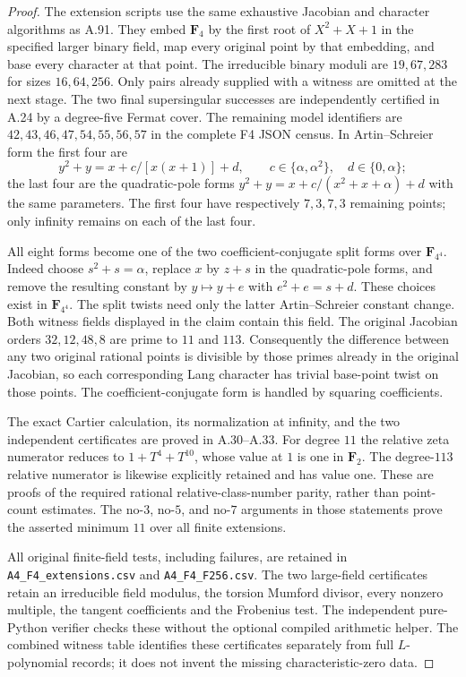 \documentclass[11pt]{article}
\begin{document}
\begin{proof}
The extension scripts use the same exhaustive Jacobian and character
algorithms as A.91. They embed $\mathbf F_4$ by the first root of
$X^2+X+1$ in the specified larger binary field, map every original
point by that embedding, and base every character at that point.
The irreducible binary moduli are $19,67,283$ for sizes $16,64,256$.
Only pairs already supplied with a witness are omitted at the next
stage. The two final supersingular successes are independently
certified in A.24 by a degree-five Fermat cover.
The remaining model identifiers are
$42,43,46,47,54,55,56,57$ in the complete F4 JSON census.
In Artin--Schreier form the first four are
\[
 y^2+y=x+c/[x(x+1)]+d,
 \qquad c\in\{\alpha,\alpha^2\},\quad d\in\{0,\alpha\};
\]
the last four are the quadratic-pole forms
$y^2+y=x+c/(x^2+x+\alpha)+d$ with the same parameters.
The first four have respectively $7,3,7,3$ remaining points;
only infinity remains on each of the last four.

All eight forms become one of the two coefficient-conjugate split
forms over $\mathbf F_{4^4}$. Indeed choose $s^2+s=\alpha$, replace
$x$ by $z+s$ in the quadratic-pole forms, and remove the resulting
constant by $y\mapsto y+e$ with $e^2+e=s+d$. These choices exist
in $\mathbf F_{4^4}$. The split twists need only the latter
Artin--Schreier constant change. Both witness fields displayed in
the claim contain this field. The original Jacobian orders
$32,12,48,8$ are prime to $11$ and $113$. Consequently the difference
between any two original rational points is divisible by those
primes already in the original Jacobian, so each corresponding
Lang character has trivial base-point twist on those points.
The coefficient-conjugate form is handled by squaring coefficients.

The exact Cartier calculation, its normalization at infinity,
and the two independent certificates are proved in A.30--A.33.
For degree $11$ the relative zeta numerator reduces to
$1+T^4+T^{10}$, whose value at $1$ is one in $\mathbf F_2$.
The degree-$113$ relative numerator is likewise explicitly retained
and has value one. These are proofs of the required rational
relative-class-number parity, rather than point-count estimates.
The no-$3$, no-$5$, and no-$7$ arguments in those statements prove
the asserted minimum $11$ over all finite extensions.

All original finite-field tests, including failures, are retained
in \texttt{A4\_F4\_extensions.csv} and
\texttt{A4\_F4\_F256.csv}. The two large-field certificates retain
an irreducible field modulus, the torsion Mumford divisor, every
nonzero multiple, the tangent coefficients and the Frobenius test.
The independent pure-Python verifier checks these without the
optional compiled arithmetic helper. The combined witness table
identifies these certificates separately from full $L$-polynomial
records; it does not invent the missing characteristic-zero data.
\end{proof}
\end{document}

